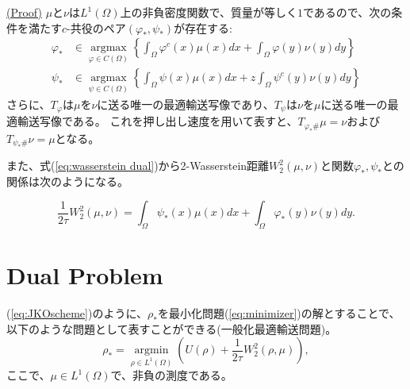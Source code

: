\begin{thm}
    \label{thm:pushforward measure}
    \hyperlink{proof:thm:pushforward measure}{(Proof)}
    $\mu$と$\nu$は$L^1(\Omega)$上の非負密度関数で、質量が等しく$1$であるので、次の条件を満たす$c$-共役のペア$(\varphi_*, \psi_*)$が存在する:
    \begin{align*}
        \varphi_* &\in \underset{\varphi \in C(\Omega)} {\operatorname{argmax}}\left\{\int_{\Omega} \varphi^c(x) \mu(x)dx + \int_{\Omega} \varphi(y) \nu(y)dy \right\} \\
        \psi_* &\in \underset{\psi \in C(\Omega)} {\operatorname{argmax}} \left\{\int_{\Omega} \psi(x) \mu(x)dx +z \int_{\Omega} \psi^c(y) \nu(y)dy \right\}
    \end{align*}
さらに、$T_\varphi$は$\mu$を$\nu$に送る唯一の最適輸送写像であり、$T_\psi$は$\nu$を$\mu$に送る唯一の最適輸送写像である。
これを押し出し速度を用いて表すと、$T_{\varphi_* \#} \mu = \nu$および$T_{\psi_* \#} \nu = \mu$となる。

また、式(\ref{eq:wasserstein dual})から2-Wasserstein距離$W^2_2(\mu, \nu)$と関数$\varphi_*, \psi_*$との関係は次のようになる。

\[
\frac{1}{2\tau}W^2_2(\mu, \nu) = \int_{\Omega} \psi_*(x) \mu(x)dx + \int_{\Omega} \varphi_*(y) \nu(y)dy.
\]
\end{thm}




\section{Dual Problem}
\label{sect:Dual Problem}
(\ref{eq:JKOscheme})のように、$\rho_*$を最小化問題(\ref{eq:minimizer})の解とすることで、以下のような問題として表すことができる(一般化最適輸送問題)。
\begin{equation}
    \label{eq: GOT}
        \rho_* = \underset{\rho \in L^1(\Omega)} {\operatorname{argmin}} \left( U(\rho) + \frac{1}{2 \tau}W_2^2(\rho, \mu) \right), 
\end{equation}
ここで、$\mu \in L^1(\Omega)$で、非負の測度である。

